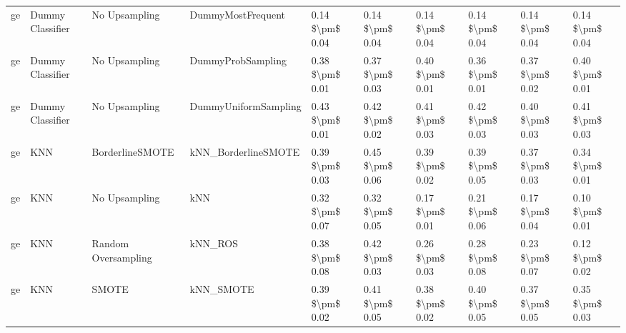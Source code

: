 \begin{tabular}{llllllllll}
      ge &                Dummy Classifier &                 No Upsampling &                            DummyMostFrequent & 0.14 \$\textbackslash pm\$ 0.04 &           0.14 \$\textbackslash pm\$ 0.04 &       0.14 \$\textbackslash pm\$ 0.04 &        0.14 \$\textbackslash pm\$ 0.04 &                         0.14 \$\textbackslash pm\$ 0.04 &     0.14 \$\textbackslash pm\$ 0.04 \\
      ge &                Dummy Classifier &                 No Upsampling &                            DummyProbSampling & 0.38 \$\textbackslash pm\$ 0.01 &           0.37 \$\textbackslash pm\$ 0.03 &       0.40 \$\textbackslash pm\$ 0.01 &        0.36 \$\textbackslash pm\$ 0.01 &                         0.37 \$\textbackslash pm\$ 0.02 &     0.40 \$\textbackslash pm\$ 0.01 \\
      ge &                Dummy Classifier &                 No Upsampling &                         DummyUniformSampling & 0.43 \$\textbackslash pm\$ 0.01 &           0.42 \$\textbackslash pm\$ 0.02 &       0.41 \$\textbackslash pm\$ 0.03 &        0.42 \$\textbackslash pm\$ 0.03 &                         0.40 \$\textbackslash pm\$ 0.03 &     0.41 \$\textbackslash pm\$ 0.03 \\
      ge &                             KNN &               BorderlineSMOTE &                          kNN\_BorderlineSMOTE & 0.39 \$\textbackslash pm\$ 0.03 &           0.45 \$\textbackslash pm\$ 0.06 &       0.39 \$\textbackslash pm\$ 0.02 &        0.39 \$\textbackslash pm\$ 0.05 &                         0.37 \$\textbackslash pm\$ 0.03 &     0.34 \$\textbackslash pm\$ 0.01 \\
      ge &                             KNN &                 No Upsampling &                                          kNN & 0.32 \$\textbackslash pm\$ 0.07 &           0.32 \$\textbackslash pm\$ 0.05 &       0.17 \$\textbackslash pm\$ 0.01 &        0.21 \$\textbackslash pm\$ 0.06 &                         0.17 \$\textbackslash pm\$ 0.04 &     0.10 \$\textbackslash pm\$ 0.01 \\
      ge &                             KNN &           Random Oversampling &                                      kNN\_ROS & 0.38 \$\textbackslash pm\$ 0.08 &           0.42 \$\textbackslash pm\$ 0.03 &       0.26 \$\textbackslash pm\$ 0.03 &        0.28 \$\textbackslash pm\$ 0.08 &                         0.23 \$\textbackslash pm\$ 0.07 &     0.12 \$\textbackslash pm\$ 0.02 \\
      ge &                             KNN &                         SMOTE &                                    kNN\_SMOTE & 0.39 \$\textbackslash pm\$ 0.02 &           0.41 \$\textbackslash pm\$ 0.05 &       0.38 \$\textbackslash pm\$ 0.02 &        0.40 \$\textbackslash pm\$ 0.05 &                         0.37 \$\textbackslash pm\$ 0.05 &     0.35 \$\textbackslash pm\$ 0.03 \\

\end{tabular}

